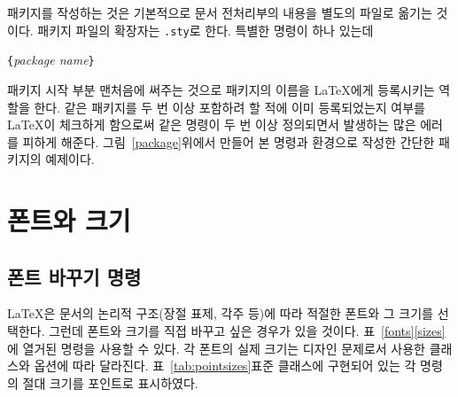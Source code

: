 패키지를 작성하는 것은 기본적으로 문서 전처리부의 내용을 별도의 파일로 옮기는 것이다.
패키지 파일의 확장자는 \texttt{.sty}로 한다. 특별한 명령이 하나 있는데
\begin{lscommand}
\verb|{|\emph{package name}\verb|}|
\end{lscommand}
\noindent 패키지 시작 부분 맨처음에 써주는 것으로 패키지의 이름을 \LaTeX 에게 등록시키는 역할을 한다. 같은 패키지를 두 번 이상 포함하려 할 적에 이미 등록되었는지 여부를 \LaTeX 이 체크하게 함으로써 같은 명령이 두 번 이상 정의되면서 발생하는 많은 에러를 피하게 해준다.
그림~\ref{package}\는 위에서 만들어 본 명령과 환경으로 작성한 간단한 패키지의 예제이다.

\section{폰트와 크기}
\label{sec:fontsize}

\subsection{폰트 바꾸기 명령}
\LaTeX 은 문서의 논리적 구조(장절 표제, 각주 등)에 따라 적절한 폰트와 그 크기를 선택한다. 그런데 폰트와 크기를 직접 바꾸고 싶은 경우가 있을 것이다.
표~\ref{fonts}\와 \ref{sizes}에 열거된 명령을 사용할 수 있다.
각 폰트의 실제 크기는 디자인 문제로서 사용한 클래스와 옵션에 따라 달라진다.
표~\ref{tab:pointsizes}\는 표준 클래스에 구현되어 있는 각 명령의 절대 크기를 포인트로 표시하였다.


